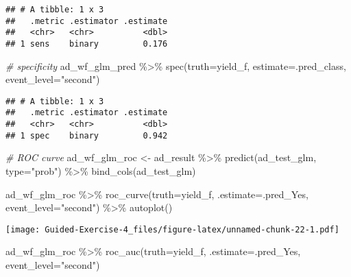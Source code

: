 \documentclass[
]{article}
\newenvironment{Shaded}{\begin{snugshade}}{\end{snugshade}}
\newcommand{\AttributeTok}[1]{\textcolor[rgb]{0.77,0.63,0.00}{#1}}
\newcommand{\CommentTok}[1]{\textcolor[rgb]{0.56,0.35,0.01}{\textit{#1}}}
\newcommand{\FunctionTok}[1]{\textcolor[rgb]{0.00,0.00,0.00}{#1}}
\newcommand{\NormalTok}[1]{#1}
\newcommand{\OtherTok}[1]{\textcolor[rgb]{0.56,0.35,0.01}{#1}}
\newcommand{\SpecialCharTok}[1]{\textcolor[rgb]{0.00,0.00,0.00}{#1}}
\newcommand{\StringTok}[1]{\textcolor[rgb]{0.31,0.60,0.02}{#1}}
\begin{document}
\begin{verbatim}
## # A tibble: 1 x 3
##   .metric .estimator .estimate
##   <chr>   <chr>          <dbl>
## 1 sens    binary         0.176
\end{verbatim}

\begin{Shaded}
\begin{Highlighting}[]
\CommentTok{\# specificity}
\NormalTok{ad\_wf\_glm\_pred }\SpecialCharTok{\%\textgreater{}\%}
  \FunctionTok{spec}\NormalTok{(}\AttributeTok{truth=}\NormalTok{yield\_f, }\AttributeTok{estimate=}\NormalTok{.pred\_class, }\AttributeTok{event\_level=}\StringTok{"second"}\NormalTok{)}
\end{Highlighting}
\end{Shaded}

\begin{verbatim}
## # A tibble: 1 x 3
##   .metric .estimator .estimate
##   <chr>   <chr>          <dbl>
## 1 spec    binary         0.942
\end{verbatim}

\begin{Shaded}
\begin{Highlighting}[]
\CommentTok{\# ROC curve}
\NormalTok{ad\_wf\_glm\_roc }\OtherTok{\textless{}{-}}\NormalTok{ ad\_result }\SpecialCharTok{\%\textgreater{}\%}
  \FunctionTok{predict}\NormalTok{(ad\_test\_glm, }\AttributeTok{type=}\StringTok{"prob"}\NormalTok{) }\SpecialCharTok{\%\textgreater{}\%}
  \FunctionTok{bind\_cols}\NormalTok{(ad\_test\_glm)}
\end{Highlighting}
\end{Shaded}

\begin{Shaded}
\begin{Highlighting}[]
\NormalTok{ad\_wf\_glm\_roc }\SpecialCharTok{\%\textgreater{}\%}
  \FunctionTok{roc\_curve}\NormalTok{(}\AttributeTok{truth=}\NormalTok{yield\_f, }\AttributeTok{.estimate=}\NormalTok{.pred\_Yes, }\AttributeTok{event\_level=}\StringTok{"second"}\NormalTok{) }\SpecialCharTok{\%\textgreater{}\%}
  \FunctionTok{autoplot}\NormalTok{()}
\end{Highlighting}
\end{Shaded}

\texttt{[image: Guided-Exercise-4\_files/figure-latex/unnamed-chunk-22-1.pdf]}

\begin{Shaded}
\begin{Highlighting}[]
\NormalTok{ad\_wf\_glm\_roc }\SpecialCharTok{\%\textgreater{}\%}
  \FunctionTok{roc\_auc}\NormalTok{(}\AttributeTok{truth=}\NormalTok{yield\_f, }\AttributeTok{.estimate=}\NormalTok{.pred\_Yes, }\AttributeTok{event\_level=}\StringTok{"second"}\NormalTok{)}
\end{Highlighting}
\end{Shaded}
\end{document}
